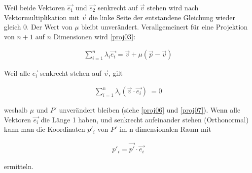 \documentclass[10pt,a4paper,twoside,titlepage]{article}
\newcommand{\myeq}[2]{
	\begin{equation}
		\begin{split}
			#1
		\end{split}
		\label{#2}
	\end{equation}
}
\begin{document}
Weil beide Vektoren $\vec{e_1}$ und $\vec{e_2}$ senkrecht auf $\vec{v}$ stehen
wird nach Vektormultiplikation mit $\vec{v}$ die linke Seite der entstandene 
Gleichung wieder gleich 0. Der Wert von $\mu$ bleibt unverändert. Verallgemeinert
für eine Projektion von $n+1$ auf $n$ Dimensionen wird \autoref{proj03}:
\myeq{
	\sum_{i=1}^{n}\lambda_i\vec{e_i} = \vec{v} + \mu(\vec{p}-\vec{v})
}{proj09}
Weil alle $\vec{e_i}$ senkrecht stehen auf $\vec{v}$, gilt
\myeq{
	\sum_{i=1}^{n}\lambda_i (\vec{v}\cdot\vec{e_i})\;=0
}{proj10}
weshalb $\mu$ und $P'$ unverändert bleiben (siehe \autoref{proj06} und 
\autoref{proj07}). Wenn alle
Vektoren $\vec{e_i}$ die Länge 1 haben, und senkrecht aufeinander stehen
(Orthonormal) kann man die Koordinaten $p'_i$ von $P'$ im n-dimensionalen 
Raum mit
\myeq{
	p'_i = \vec{p'}\cdot\vec{e_i}
}{proj11}
ermitteln.
\end{document}
